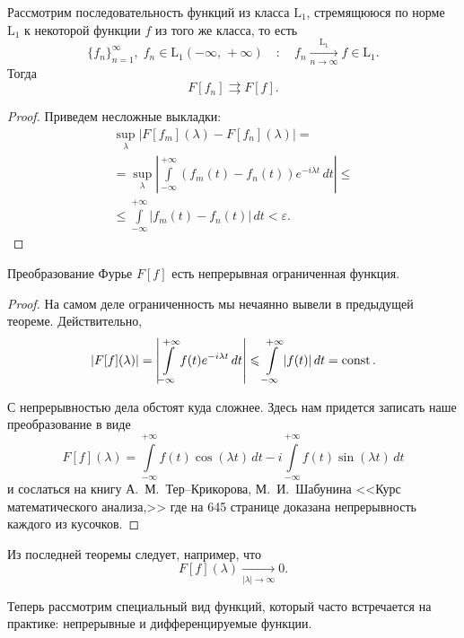 \begin{theorem}
        Рассмотрим последовательность функций из класса $\mathrm{L}_1$, стремящююся по норме $\mathrm{L}_1$ к некоторой функции $f$ из того же класса, то есть
$$
        \{f_n\}_{n=1}^{\infty},\;f_n \in \mathrm{L}_1(-\infty,\,+\infty)
\quad : \quad
        f_n \xrightarrow[n\to\infty]{\mathrm{L}_1} f \in \mathrm{L}_1.
$$
Тогда
$$
        F[f_n] \rightrightarrows F[f].
$$
\end{theorem}
\begin{proof} Приведем несложные выкладки:
\begin{multline*}
        \sup\limits_{\lambda}|F[f_m](\lambda) - F[f_n](\lambda)| = \\
        =\sup\limits_\lambda\left|\int\limits_{-\infty}^{+\infty}(f_m(t) - f_n(t))e^{-i\lambda t}\, dt\right| \leqslant \\
        \leqslant\int\limits_{-\infty}^{+\infty}|f_m(t) - f_n(t)|\,dt < \varepsilon.
\end{multline*}
\end{proof}

\begin{theorem}
        Преобразование Фурье $F[f]$ есть непрерывная ограниченная функция.
\end{theorem}
\begin{proof}
        На самом деле ограниченность мы нечаянно вывели в предыдущей теореме. Действительно,
$$
        |F[f](\lambda)| = \left|\int\limits_{-\infty}^{+\infty} f(t) e^{-i\lambda t}\,dt\right| \leqslant \int\limits_{-\infty}^{+\infty}|f(t)|\,dt = \operatorname{const}.
$$
        
        С непрерывностью дела обстоят куда сложнее. Здесь нам придется записать наше преобразование в виде
$$
        F[f](\lambda) = \int\limits_{-\infty}^{+\infty}f(t)\cos(\lambda t)\,dt - i\int\limits_{-\infty}^{+\infty}f(t)\sin(\lambda t)\,dt
$$
        и сослаться на книгу А.~М.~Тер--Крикорова, М.~И.~Шабунина <<Курс математического анализа,>> где на 645 странице доказана непрерывность каждого из кусочков.
\end{proof}
\begin{remark}
        Из последней теоремы следует, например, что
$$
        F[f](\lambda)\xrightarrow[|\lambda|\to\infty]{} 0.
$$
\end{remark}

Теперь рассмотрим специальный вид функций, который часто встречается на практике: непрерывные и дифференцируемые функции.

